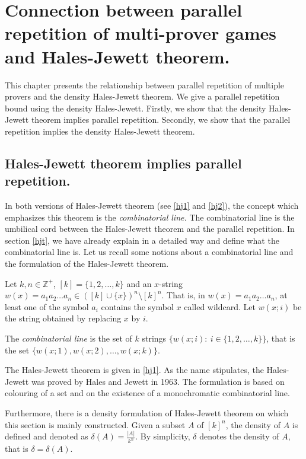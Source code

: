 

\chapter{Connection between parallel repetition of multi-prover games and  Hales-Jewett theorem.}

This chapter presents the relationship between parallel repetition of multiple provers and the density Hales-Jewett theorem. We give a parallel repetition bound using the density Hales-Jewett. Firstly, we show that the density Hales-Jewett theorem implies parallel repetition. Secondly, we show that the parallel repetition implies the density Hales-Jewett theorem.

\section{Hales-Jewett theorem implies parallel repetition.}

In both versions of Hales-Jewett theorem (see \eqref{hj1} and \eqref{hj2}), the concept which emphasizes this theorem is the \textit{combinatorial line.} The combinatorial line is the umbilical cord between the Hales-Jewett theorem and the parallel repetition. In section \eqref{hjt}, we have already explain in a detailed way
and define what the combinatorial line is. Let us recall some notions about a combinatorial line and the formulation of the Hales-Jewett theorem.

Let $k, n\in \mathbb{Z}^+$, $[k]=\{1,2, \ldots,k\}$ and an $x$-string $w(x)=a_1a_2\ldots a_n \in ([k]\cup \{x\})^n\setminus [k]^n.$ That is, in $w(x)=a_1a_2\ldots a_n$, at least one of the symbol   $a_i$ contains the symbol  $x$ called wildcard. Let $w(x;i)$ be the string obtained by replacing $x$ by $i$.

The \textit{combinatorial line} is the set of $k$ strings $\{w(x;i): \ i\in \{1,2,\ldots,k\} \}$, that is the set $\{w(x;1), w(x;2), \ldots, w(x;k)\}.$ 
 
The Hales-Jewett theorem is given in \eqref{hj1}.
As the name stipulates, the Hales-Jewett was proved by Hales and Jewett in 1963. The formulation is based on colouring of a set and on the existence of  a monochromatic combinatorial line.

Furthermore, there is a density formulation of Hales-Jewett theorem on which this section is mainly constructed. Given a subset $A$ of $[k]^n$, the density of $A$ is defined and denoted as $\delta(A)=\frac{|A|}{k^n}.$ By simplicity, $\delta$ denotes the density of $A$, that is $\delta=\delta(A).$

